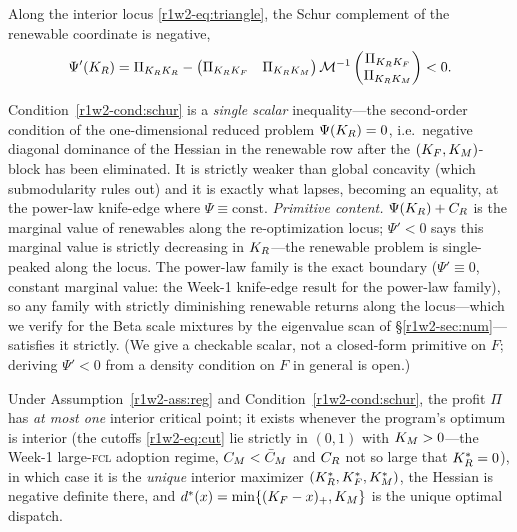 \begin{condition}\label{r1w2-cond:schur}
Along the interior locus \eqref{r1w2-eq:triangle}, the Schur complement of the renewable
coordinate is negative,
\begin{equation}\label{r1w2-eq:schur}
  \Psi'(K_R)=\Pi_{K_RK_R}-\begin{pmatrix}\Pi_{K_RK_F}&\Pi_{K_RK_M}\end{pmatrix}
  \mathcal M^{-1}\begin{pmatrix}\Pi_{K_RK_F}\\ \Pi_{K_RK_M}\end{pmatrix}<0 .
\end{equation}
\end{condition}

Condition~\ref{r1w2-cond:schur} is a \emph{single scalar} inequality---the
second-order condition of the one-dimensional reduced problem $\Psi(K_R)=0$,
i.e.\ negative diagonal dominance of the Hessian in the renewable row after the
$(K_F,K_M)$-block has been eliminated. It is strictly weaker than global
concavity (which submodularity rules out) and it is exactly what lapses, becoming
an equality, at the power-law knife-edge where $\Psi\equiv\text{const}$.
\emph{Primitive content.} $\Psi(K_R)+C_R$ is the marginal value of renewables along
the re-optimization locus; $\Psi'<0$ says this marginal value is strictly
decreasing in $K_R$---the renewable problem is single-peaked along the locus. The
power-law family is the exact boundary ($\Psi'\equiv0$, constant marginal value:
the Week-1 knife-edge result for the power-law family), so any family with strictly diminishing
renewable returns along the locus---which we verify for the Beta scale mixtures by
the eigenvalue scan of \S\ref{r1w2-sec:num}---satisfies it strictly. (We give a
checkable scalar, not a closed-form primitive on $F$; deriving $\Psi'<0$ from a
density condition on $F$ in general is open.)

\begin{theorem}\label{r1w2-thm:unique}
Under Assumption~\ref{r1w2-ass:reg} and Condition~\ref{r1w2-cond:schur}, the profit $\Pi$
has \emph{at most one} interior critical point; it exists whenever the program's
optimum is interior (the cutoffs \eqref{r1w2-eq:cut} lie strictly in $(0,1)$ with
$K_M>0$---the Week-1 large-\textsc{fcl} adoption regime, $C_M<\bar C_M$ and $C_R$ not
so large that $K_R^{*}=0$), in which case it is the \emph{unique} interior maximizer
$(K_R^{*},K_F^{*},K_M^{*})$, the Hessian is negative definite there, and
$d^{*}(x)=\min\{(K_F-x)_+,K_M\}$ is the unique optimal dispatch.
\end{theorem}

